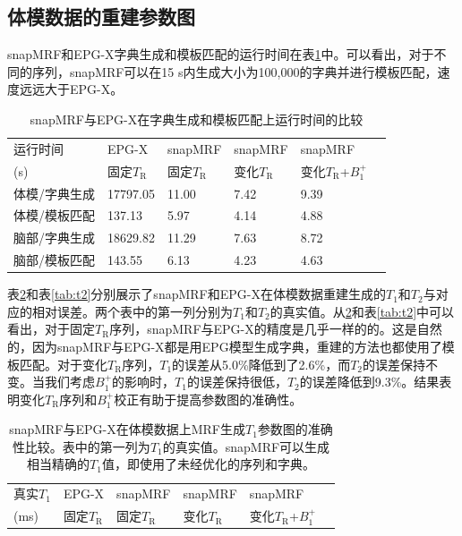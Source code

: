 \subsection{体模数据的重建参数图}
snapMRF和EPG-X字典生成和模板匹配的运行时间在表\ref{tab:time}中。可以看出，对于不同的序列，snapMRF可以在15 s内生成大小为100,000的字典并进行模板匹配，速度远远大于EPG-X。

\begin{table}
\caption{snapMRF与EPG-X在字典生成和模板匹配上运行时间的比较}
\centering
\label{tab:time}
\begin{tabular}{|l|l|l|l|l|l|}
\hline
\hline
运行时间 & EPG-X & snapMRF & snapMRF & snapMRF\\ 
(s) & 固定$T_\mathrm{R}$ & 固定$T_\mathrm{R}$ & 变化$T_\mathrm{R}$ & 变化$T_\mathrm{R}$+$B_1^+$\\
\hline
体模/字典生成 & 17797.05 & 11.00 & 7.42 & 9.39 \\
\hline
体模/模板匹配 & 137.13 & 5.97 & 4.14 & 4.88\\
\hline
脑部/字典生成 & 18629.82 & 11.29 & 7.63 & 8.72 \\
\hline
脑部/模板匹配 & 143.55 & 6.13 & 4.23 & 4.63 \\
\hline
\end{tabular}
\end{table}

表\ref{tab:t1}和表\ref{tab:t2}分别展示了snapMRF和EPG-X在体模数据重建生成的$T_1$和$T_2$与对应的相对误差。两个表中的第一列分别为$T_1$和$T_2$的真实值。从\ref{tab:t1}和表\ref{tab:t2}中可以看出，对于固定$T_\mathrm{R}$序列，snapMRF与EPG-X的精度是几乎一样的的。这是自然的，因为snapMRF与EPG-X都是用EPG模型生成字典，重建的方法也都使用了模板匹配。对于变化$T_\mathrm{R}$序列，$T_1$的误差从5.0\%降低到了2.6\%，而$T_2$的误差保持不变。当我们考虑$B_1^+$的影响时，$T_1$的误差保持很低，$T_2$的误差降低到9.3\%。结果表明变化$T_\mathrm{R}$序列和$B_1^+$校正有助于提高参数图的准确性。

\begin{table}
\caption{snapMRF与EPG-X在体模数据上MRF生成$T_1$参数图的准确性比较。表中的第一列为$T_1$的真实值。snapMRF可以生成相当精确的$T_1$值，即使用了未经优化的序列和字典。}
\centering
\label{tab:t1}
\begin{tabular}{|l|l|l|l|l|l|}
\hline
\hline
真实$T_1$ & EPG-X & snapMRF & snapMRF & snapMRF\\ 
(ms) & 固定$T_\mathrm{R}$ & 固定$T_\mathrm{R}$ & 变化$T_\mathrm{R}$ & 变化$T_\mathrm{R}$+$B_1^+$\\
\hline
 
\hline
\end{tabular}
\end{table}


